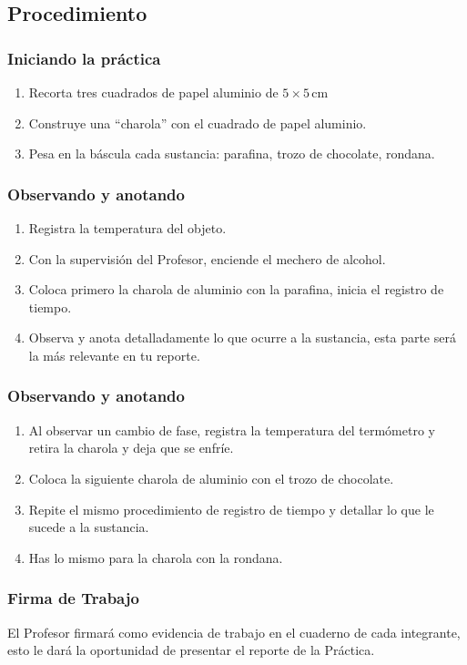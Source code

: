 \documentclass[14pt]{beamer}
\begin{document}
\subsection{Procedimiento}

\begin{frame}
\frametitle{Iniciando la práctica}
\begin{enumerate}[<+->]
\item Recorta tres cuadrados de papel aluminio de $5 \times 5 \, \unit{\centi\meter}$
\item Construye una \enquote{charola} con el cuadrado de papel aluminio.
\item Pesa en la báscula cada sustancia: parafina, trozo de chocolate, rondana.
\seti
\end{enumerate}
\end{frame}
\begin{frame}
\frametitle{Observando y anotando}
\begin{enumerate}[<+->]
\conti
\item Registra la temperatura del objeto.
\item Con la supervisión del Profesor, enciende el mechero de alcohol.
\item Coloca primero la charola de aluminio con la parafina, inicia el registro de tiempo.
\item Observa y anota detalladamente lo que ocurre a la sustancia, esta parte será la más relevante en tu reporte.
\seti
\end{enumerate}
\end{frame}
\begin{frame}
\frametitle{Observando y anotando}
\begin{enumerate}[<+->]
\conti
\item Al observar un cambio de fase, registra la temperatura del termómetro y retira la charola y deja que se enfríe.
\item Coloca la siguiente charola de aluminio con el trozo de chocolate.
\item Repite el mismo procedimiento de registro de tiempo y detallar lo que le sucede a la sustancia.
\item Has lo mismo para la charola con la rondana.
\seti
\end{enumerate}
\end{frame}
\begin{frame}
\frametitle{Firma de Trabajo}
El Profesor firmará como evidencia de trabajo en el cuaderno de cada integrante, esto le dará la oportunidad de presentar el reporte de la Práctica.
\end{frame}
\end{document}
